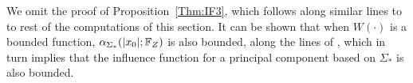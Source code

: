 We omit the proof of Proposition~\ref{Thm:IF3}, which follows along similar lines to 
to rest of the computations of this section.
It can be shown that when $W (\cdot)$ is a bounded function, 
$\alpha_{\Sigma_{*}} ( | x_{0} |; {\mathbb{F}}_{Z} )$ is also bounded, along the lines of 
\cite{ref:HuberBook81}, which in turn implies that the influence function for a 
principal component based on $\Sigma_{*}$ is also bounded.


